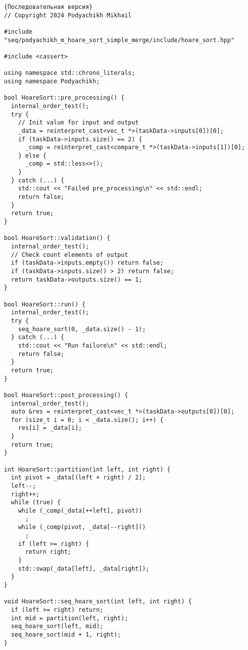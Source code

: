 \documentclass{report}
\begin{document}
\begin{lstlisting}{Последовательная версия}
// Copyright 2024 Podyachikh Mikhail

#include "seq/podyachikh_m_hoare_sort_simple_merge/include/hoare_sort.hpp"

#include <cassert>

using namespace std::chrono_literals;
using namespace Podyachikh;

bool HoareSort::pre_processing() {
  internal_order_test();
  try {
    // Init value for input and output
    _data = reinterpret_cast<vec_t *>(taskData->inputs[0])[0];
    if (taskData->inputs.size() == 2) {
      _comp = reinterpret_cast<compare_t *>(taskData->inputs[1])[0];
    } else {
      _comp = std::less<>();
    }
  } catch (...) {
    std::cout << "Failed pre_processing\n" << std::endl;
    return false;
  }
  return true;
}

bool HoareSort::validation() {
  internal_order_test();
  // Check count elements of output
  if (taskData->inputs.empty()) return false;
  if (taskData->inputs.size() > 2) return false;
  return taskData->outputs.size() == 1;
}

bool HoareSort::run() {
  internal_order_test();
  try {
    seq_hoare_sort(0, _data.size() - 1);
  } catch (...) {
    std::cout << "Run failure\n" << std::endl;
    return false;
  }
  return true;
}

bool HoareSort::post_processing() {
  internal_order_test();
  auto &res = reinterpret_cast<vec_t *>(taskData->outputs[0])[0];
  for (size_t i = 0; i < _data.size(); i++) {
    res[i] = _data[i];
  }
  return true;
}

int HoareSort::partition(int left, int right) {
  int pivot = _data[(left + right) / 2];
  left--;
  right++;
  while (true) {
    while (_comp(_data[++left], pivot))
      ;
    while (_comp(pivot, _data[--right]))
      ;
    if (left >= right) {
      return right;
    }
    std::swap(_data[left], _data[right]);
  }
}

void HoareSort::seq_hoare_sort(int left, int right) {
  if (left >= right) return;
  int mid = partition(left, right);
  seq_hoare_sort(left, mid);
  seq_hoare_sort(mid + 1, right);
}
\end{lstlisting}
\newpage
\end{document}

